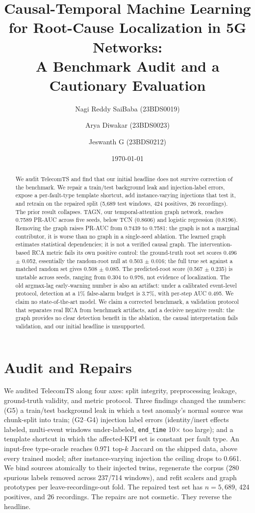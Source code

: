 \documentclass[10pt]{article}
\title{Causal-Temporal Machine Learning for Root-Cause Localization in 5G Networks:\\ A Benchmark Audit and a Cautionary Evaluation}
\author{Nagi Reddy SaiBaba (23BDS0019) \and Arya Diwakar (23BDS0023) \and Jeswanth G (23BDS0212)}
\date{\today}
\begin{document}
\maketitle

\begin{abstract}
We audit TelecomTS and find that our initial headline does not survive
correction of the benchmark. We repair a train/test background leak and
injection-label errors, expose a per-fault-type template shortcut, add
instance-varying injections that test it, and retrain on the repaired split (5,689 test
windows, 424 positives, 26 recordings). The prior result collapses. TAGN, our
temporal-attention graph network, reaches 0.7589 PR-AUC across five seeds,
below TCN (0.8606) and logistic regression (0.8196). Removing the graph raises
PR-AUC from 0.7439 to 0.7581: the graph is not a marginal contributor, it is
worse than no graph in a single-seed ablation. The learned graph estimates
statistical dependencies; it is not a verified causal graph. The intervention-based RCA metric fails its own positive control:
the ground-truth root set scores 0.496 $\pm$ 0.052, essentially the
random-root null at 0.503 $\pm$ 0.016; the full true set against a matched
random set gives 0.508 $\pm$ 0.085. The predicted-root score
(0.567 $\pm$ 0.235) is unstable across seeds, ranging from 0.304 to 0.976, not
evidence of localization. The old argmax-lag early-warning number is also an
artifact: under a calibrated event-level protocol, detection at a 1\%
false-alarm budget is 3.7\%, with per-step AUC 0.495. We claim no
state-of-the-art model. We claim a corrected benchmark, a validation protocol
that separates real RCA from benchmark artifacts, and a decisive negative
result: the graph provides no clear detection benefit in the ablation, the
causal interpretation fails validation, and our initial headline is unsupported.
\end{abstract}

\section{Audit and Repairs}
We audited TelecomTS along four axes: split integrity, preprocessing leakage,
ground-truth validity, and metric protocol. Three findings changed the numbers:
(G5) a train/test background leak in which a test anomaly's normal source was
chunk-split into train; (G2--G4) injection label errors (identity/inert effects
labeled, multi-event windows under-labeled, \texttt{end\_time} 10$\times$ too
large); and a template shortcut in which the affected-KPI set is constant per
fault type. An input-free type-oracle reaches 0.971 top-$k$ Jaccard on the
shipped data, above every trained model; after instance-varying injection the
ceiling drops to 0.661. We bind sources atomically to their injected twins,
regenerate the corpus (280 spurious labels removed across 237/714 windows),
and refit scalers and graph prototypes per leave-recordings-out fold. The
repaired test set has $n=5{,}689$, 424 positives, and 26 recordings. The
repairs are not cosmetic. They reverse the headline.
\end{document}
